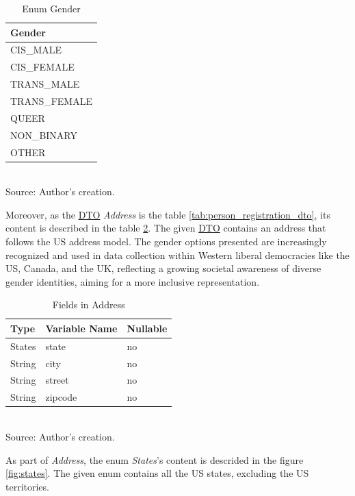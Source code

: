 \begin{table}[H]
	\centering
	\caption{Enum Gender}
	\begin{tabular}{l}
		\toprule
		\textbf{Gender} \\
		\midrule
		CIS\_MALE \\ \hline
		CIS\_FEMALE \\ \hline
		TRANS\_MALE \\ \hline
		TRANS\_FEMALE \\ \hline
		QUEER \\ \hline
		NON\_BINARY \\ \hline
		OTHER \\
		\bottomrule
	\end{tabular}
	\\ \footnotesize Source: Author's creation.
	\label{tab:gender}
\end{table}

Moreover, as the \hyperref[appendix:glossary]{DTO} \textit{Address} is the table \ref{tab:person_registration_dto}, its content is described in the table \ref{tab:address}. The given \hyperref[appendix:glossary]{DTO} contains an address that follows the US address model. The gender options presented are increasingly recognized and used in data collection within Western liberal democracies like the US, Canada, and the UK, reflecting a growing societal awareness of diverse gender identities, aiming for a more inclusive representation.

\begin{table}[H]
	\centering
	\caption{Fields in Address}
	\begin{tabular}{lll}
		\toprule
		\textbf{Type} & \textbf{Variable Name} & \textbf{Nullable} \\
		\midrule
		States & state & no \\ \hline
		String & city & no \\ \hline
		String & street & no \\ \hline
		String & zipcode & no \\
		\bottomrule
	\end{tabular}
	\\ \footnotesize Source: Author's creation.
	\label{tab:address}
\end{table}

As part of \textit{Address}, the enum \textit{States}'s content is descrided in the figure \ref{fig:states}. The given enum contains all the US states, excluding the US territories.

